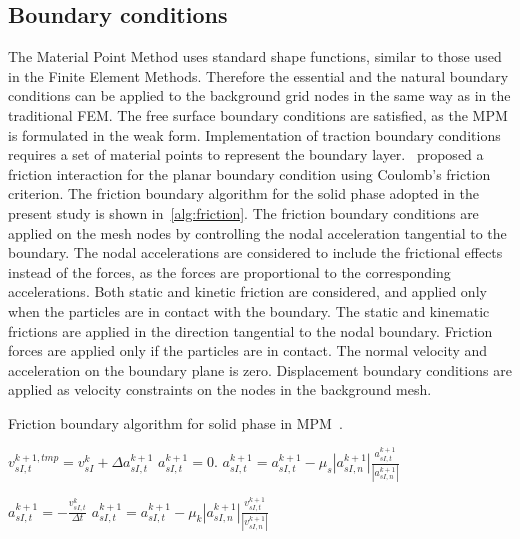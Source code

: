 \subsection{Boundary conditions}
The Material Point Method uses standard shape functions, similar to those used 
in the Finite Element Methods. Therefore the essential and the natural boundary 
conditions can be applied to the background grid nodes in the same way as in 
the traditional FEM. The free surface boundary conditions are satisfied, as the 
MPM is formulated in the weak form. Implementation of traction boundary 
conditions requires a set of material points to represent the boundary 
layer.~\citet{Bandara2013} proposed a friction interaction for the planar 
boundary condition using Coulomb's friction criterion. The friction boundary 
algorithm for the solid phase adopted in the present study is shown 
in~\cref{alg:friction}. The friction boundary conditions are applied on the 
mesh nodes by controlling the nodal acceleration tangential to the boundary. 
The nodal accelerations are considered to include the frictional effects 
instead of the forces, as the forces are proportional to the corresponding 
accelerations. Both static and kinetic friction are considered, and applied 
only when the particles are in contact with the boundary. The static and 
kinematic frictions are applied in the direction tangential to the nodal 
boundary. Friction forces are applied only if the particles are in contact. 
The normal velocity and acceleration on the boundary plane is zero. 
Displacement boundary conditions are applied as velocity constraints on the 
nodes in the background mesh.

\begin{algorithm}[tbhp]
\caption{Friction boundary algorithm for solid phase in MPM~\citep{Bandara2013}.}
\label{alg:friction}
\begin{algorithmic}
    \State $v_{sI,t}^{k+1,tmp}=v_{sI}^k+\Delta a_{sI,t}^{k+1}$
     
            \State $a_{sI,t}^{k+1}= 0.$
        \Else {}
            \State $a_{sI,t}^{k+1} = a_{sI,t}^{k+1} - \mu_s  \left| a_{sI,n}^{k+1} \right| \frac{a_{sI,t}^{k+1}}{ \left| a_{sI,n}^{k+1} \right|}$

        \EndIf
    \Else  {}
            \State $a_{sI,t}^{k+1} = - \frac{v_{sI,t}^{k}}{\Delta t}$
        \Else {}
            \State $a_{sI,t}^{k+1} = a_{sI,t}^{k+1} - \mu_k  \left| a_{sI,n}^{k+1} \right| \frac{v_{sI,t}^{k+1}}{ \left| v_{sI,n}^{k+1} \right|}$
        \EndIf
    \EndIf
\EndIf
\end{algorithmic}
\end{algorithm}

